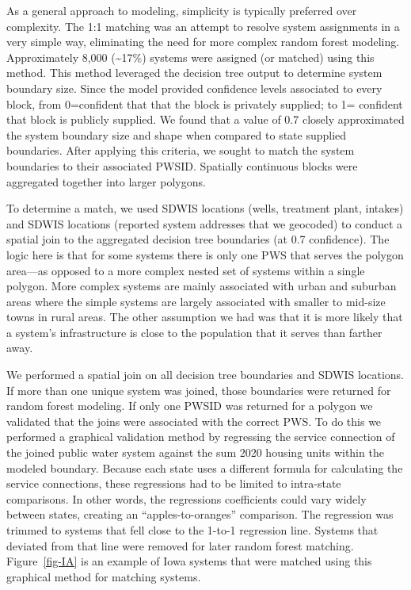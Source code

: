 \documentclass[12pt]{article}
\begin{document}
As a general approach to modeling, simplicity is typically preferred
over complexity. The 1:1 matching was an attempt to resolve system
assignments in a very simple way, eliminating the need for more complex
random forest modeling. Approximately 8,000 (\textasciitilde17\%)
systems were assigned (or matched) using this method. This method
leveraged the decision tree output to determine system boundary size.
Since the model provided confidence levels associated to every block,
from 0=confident that that the block is privately supplied; to 1=
confident that block is publicly supplied. We found that a value of 0.7
closely approximated the system boundary size and shape when compared to
state supplied boundaries. After applying this criteria, we sought to
match the system boundaries to their associated PWSID. Spatially
continuous blocks were aggregated together into larger polygons.

To determine a match, we used SDWIS locations (wells, treatment plant,
intakes) and SDWIS locations (reported system addresses that we
geocoded) to conduct a spatial join to the aggregated decision tree
boundaries (at 0.7 confidence). The logic here is that for some systems
there is only one PWS that serves the polygon area---as opposed to a
more complex nested set of systems within a single polygon. More complex
systems are mainly associated with urban and suburban areas where the
simple systems are largely associated with smaller to mid-size towns in
rural areas. The other assumption we had was that it is more likely that
a system's infrastructure is close to the population that it serves than
farther away.

We performed a spatial join on all decision tree boundaries and SDWIS
locations. If more than one unique system was joined, those boundaries
were returned for random forest modeling. If only one PWSID was returned
for a polygon we validated that the joins were associated with the
correct PWS. To do this we performed a graphical validation method by
regressing the service connection of the joined public water system
against the sum 2020 housing units within the modeled boundary. Because
each state uses a different formula for calculating the service
connections, these regressions had to be limited to intra-state
comparisons. In other words, the regressions coefficients could vary
widely between states, creating an ``apples-to-oranges'' comparison. The
regression was trimmed to systems that fell close to the 1-to-1
regression line. Systems that deviated from that line were removed for
later random forest matching. Figure~\ref{fig-IA} is an example of Iowa
systems that were matched using this graphical method for matching
systems.
\end{document}
